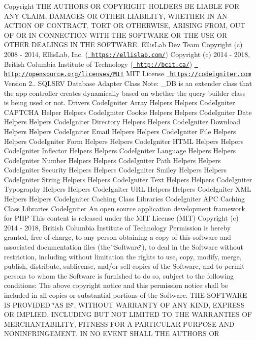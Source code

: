 \begin{DoxyCopyright}{Copyright}
T\+HE A\+U\+T\+H\+O\+RS OR C\+O\+P\+Y\+R\+I\+G\+HT H\+O\+L\+D\+E\+RS BE L\+I\+A\+B\+LE F\+OR A\+NY C\+L\+A\+IM, D\+A\+M\+A\+G\+ES OR O\+T\+H\+ER L\+I\+A\+B\+I\+L\+I\+TY, W\+H\+E\+T\+H\+ER IN AN A\+C\+T\+I\+ON OF C\+O\+N\+T\+R\+A\+CT, T\+O\+RT OR O\+T\+H\+E\+R\+W\+I\+SE, A\+R\+I\+S\+I\+NG F\+R\+OM, O\+UT OF OR IN C\+O\+N\+N\+E\+C\+T\+I\+ON W\+I\+TH T\+HE S\+O\+F\+T\+W\+A\+RE OR T\+HE U\+SE OR O\+T\+H\+ER D\+E\+A\+L\+I\+N\+GS IN T\+HE S\+O\+F\+T\+W\+A\+RE.  Ellis\+Lab Dev Team  Copyright (c) 2008 -\/ 2014, Ellis\+Lab, Inc. (\href{https://ellislab.com/}{\texttt{ https\+://ellislab.\+com/}})  Copyright (c) 2014 -\/ 2018, British Columbia Institute of Technology (\href{http://bcit.ca/}{\texttt{ http\+://bcit.\+ca/}})  \href{http://opensource.org/licenses/MIT}{\texttt{ http\+://opensource.\+org/licenses/\+M\+IT}} M\+IT License  \href{https://codeigniter.com}{\texttt{ https\+://codeigniter.\+com}}  Version 2..  S\+Q\+L\+S\+RV Database Adapter Class Note\+: \+\_\+\+DB is an extender class that the app controller creates dynamically based on whether the query builder class is being used or not.  Drivers Code\+Igniter Array Helpers  Helpers Code\+Igniter C\+A\+P\+T\+C\+HA Helper  Helpers Code\+Igniter Cookie Helpers  Helpers Code\+Igniter Date Helpers  Helpers Code\+Igniter Directory Helpers  Helpers Code\+Igniter Download Helpers  Helpers Code\+Igniter Email Helpers  Helpers Code\+Igniter File Helpers  Helpers Code\+Igniter Form Helpers  Helpers Code\+Igniter H\+T\+ML Helpers  Helpers Code\+Igniter Inflector Helpers  Helpers Code\+Igniter Language Helpers  Helpers Code\+Igniter Number Helpers  Helpers Code\+Igniter Path Helpers  Helpers Code\+Igniter Security Helpers  Helpers Code\+Igniter Smiley Helpers  Helpers Code\+Igniter String Helpers  Helpers Code\+Igniter Text Helpers  Helpers Code\+Igniter Typography Helpers  Helpers Code\+Igniter U\+RL Helpers  Helpers Code\+Igniter X\+ML Helpers  Helpers Code\+Igniter Caching Class  Libraries Code\+Igniter A\+PC Caching Class  Libraries Code\+Igniter An open source application development framework for P\+HP This content is released under the M\+IT License (M\+IT) Copyright (c) 2014 -\/ 2018, British Columbia Institute of Technology Permission is hereby granted, free of charge, to any person obtaining a copy of this software and associated documentation files (the \char`\"{}\+Software\char`\"{}), to deal in the Software without restriction, including without limitation the rights to use, copy, modify, merge, publish, distribute, sublicense, and/or sell copies of the Software, and to permit persons to whom the Software is furnished to do so, subject to the following conditions\+: The above copyright notice and this permission notice shall be included in all copies or substantial portions of the Software. T\+HE S\+O\+F\+T\+W\+A\+RE IS P\+R\+O\+V\+I\+D\+ED \char`\"{}\+A\+S I\+S\char`\"{}, W\+I\+T\+H\+O\+UT W\+A\+R\+R\+A\+N\+TY OF A\+NY K\+I\+ND, E\+X\+P\+R\+E\+SS OR I\+M\+P\+L\+I\+ED, I\+N\+C\+L\+U\+D\+I\+NG B\+UT N\+OT L\+I\+M\+I\+T\+ED TO T\+HE W\+A\+R\+R\+A\+N\+T\+I\+ES OF M\+E\+R\+C\+H\+A\+N\+T\+A\+B\+I\+L\+I\+TY, F\+I\+T\+N\+E\+SS F\+OR A P\+A\+R\+T\+I\+C\+U\+L\+AR P\+U\+R\+P\+O\+SE A\+ND N\+O\+N\+I\+N\+F\+R\+I\+N\+G\+E\+M\+E\+NT. IN NO E\+V\+E\+NT S\+H\+A\+LL T\+HE A\+U\+T\+H\+O\+RS OR 
\end{DoxyCopyright}

